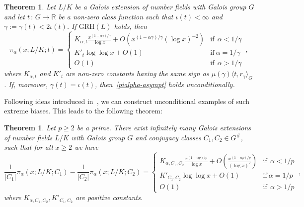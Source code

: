 \documentclass[12pt]{amsart}
\numberwithin{equation}{section}
\newcommand{\R}{\mathbb R}
\newtheorem{thm}[X]{Theorem}
\theoremstyle{definition}
\theoremstyle{remark}
\begin{document}
\begin{thm}\label{criterion-extreme-bias}
    Let $L/K$ be a Galois extension of number fields with Galois group $G$ and let $t\, \colon\,  G\to \R$ be a non-zero class function such that $\iota(t)<\infty$ and $\gamma:=\gamma(t)<2\iota(t)$. If $\mathrm{GRH}(L)$ holds, then 
    \begin{equation}\label{pialpha-asympt}
        \pi_\alpha(x;L/K;t)=\begin{cases}
            K_{\alpha,t}\frac{x^{(1-\alpha \gamma)/\gamma}}{\log x}+O\left(x^{(1-\alpha \gamma)/\gamma}(\log x)^{-2}\right) &\text{if}\ \  \alpha<1/\gamma\\
           K'_t \log \log x+O(1) &\text{if}\ \alpha=1/\gamma\\
            O(1)  &\text{if}\ \ \alpha > 1/\gamma
            \end{cases}\, ,
    \end{equation}
    where $K_{\alpha,t}$ and  $K'_t$ are non-zero constants having the same sign as $\mu(\gamma)\langle t,r_\gamma\rangle_G$. If, moreover, $\gamma(t)=\iota(t)$, then~\eqref{pialpha-asympt} holds unconditionally.
\end{thm}

Following ideas introduced in~\cite{Hay}, we can construct unconditional examples of such extreme biases. This leads to the following theorem:

\begin{thm}\label{existence-extreme-bias}
    Let $p\ge2$ be a prime. There exist infinitely many Galois extensions of number fields $L/K$ with Galois group $G$ and conjugacy classes $C_1,C_2\in G^\#$, such that for all $x\ge2$ we have
    \[ \frac{1}{|C_1|}\pi_{\alpha}(x;L/K;C_1)-\frac{1}{|C_2|}\pi_{\alpha}(x;L/K;C_2)=\begin{cases}
            K_{\alpha,C_1,C_2}\frac{x^{(1-\alpha p)/p}}{\log x}+O\left(\frac{x^{(1-\alpha p)/p}}{(\log x)^{2}}\right) &\text{if}\ \  \alpha<1/p\\
           K'_{C_1,C_2} \log \log x+O(1) &\text{if}\ \alpha=1/p\\
            O(1)  &\text{if}\ \ \alpha > 1/p
            \end{cases}\, , \]
    where $K_{\alpha,C_1,C_2}, K'_{C_1,C_2}$ are positive constants.
\end{thm}
\end{document}
